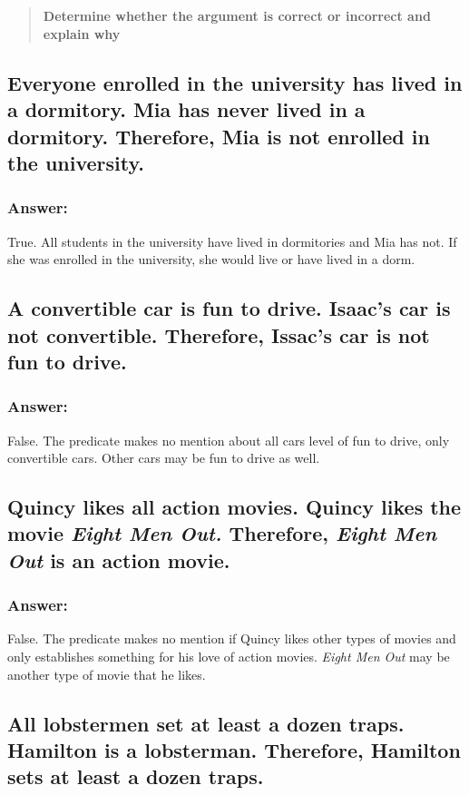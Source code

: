 \documentclass[titlepage]{article}\usepackage[]{graphicx}\usepackage[]{color}
\begin{document}
\section{ }
\begin{quote}
  \textbf{Determine whether the argument is correct or incorrect and explain
  why}
\end{quote}
\subsection{Everyone enrolled in the university has lived in a dormitory. Mia
has never lived in a dormitory. Therefore, Mia is not enrolled in the
university.}
\subsubsection{Answer:}
True. All students in the university have lived in dormitories and Mia has not.
If she was enrolled in the university, she would live or have lived in a dorm.  

\subsection{A convertible car is fun to drive. Isaac's car is not convertible.
Therefore, Issac's car is not fun to drive.}
\subsubsection{Answer:}
False. The predicate makes no mention about all cars level of fun to drive,
only convertible cars. Other cars may be fun to drive as well.

\subsection{Quincy likes all action movies. Quincy likes the movie
  \textit{Eight Men Out.} Therefore, \textit{Eight Men Out} is an action
movie.}
\subsubsection{Answer:}
False. The predicate makes no mention if Quincy likes other types of movies and
only establishes something for his love of action movies. \textit{Eight Men
Out} may be another type of movie that he likes.

\subsection{All lobstermen set at least a dozen traps. Hamilton is a
lobsterman. Therefore, Hamilton sets at least a dozen traps.}
\end{document}
